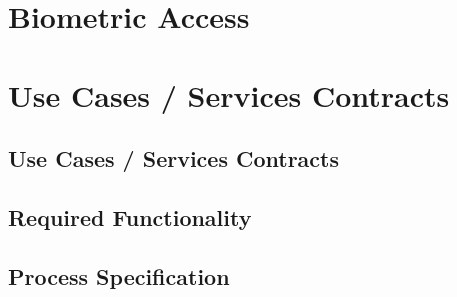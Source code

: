 \documentclass[11pt,a4paper,titlepage]{article}
\begin{document}
	\section{Biometric Access}
	
		
		
	
	\section{Use Cases / Services Contracts}

	\subsection{Use Cases / Services Contracts}

		
		
	
	\subsection{Required Functionality}
		
		
	
	\subsection{Process Specification}
		
		
	

	
\end{document}
